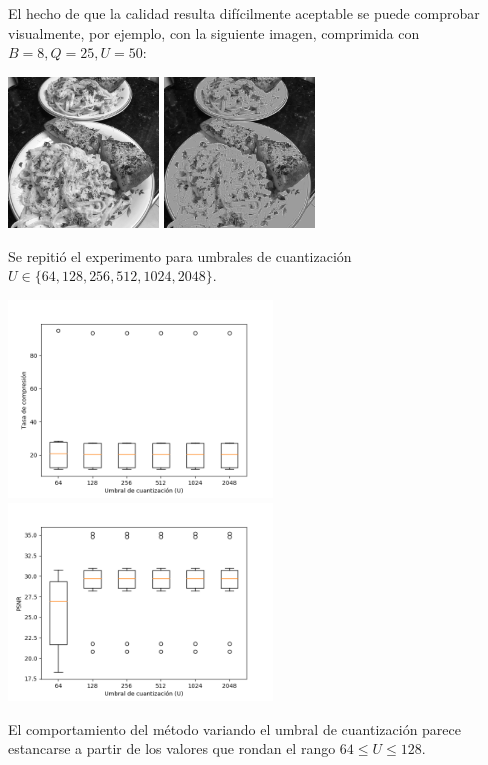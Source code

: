 \documentclass{article}
\newcommand{\set}[1]{\{#1\}}
\begin{document}
El hecho de que la calidad resulta difícilmente aceptable
se puede comprobar
visualmente, por ejemplo, con la siguiente imagen, comprimida
con $B = 8, Q = 25, U = 50$:
\begin{center}
\includegraphics[width=4cm]{../imgs/input/imgs_gray/img07.png}
\includegraphics[width=4cm]{../imgs/output/gray_8_25_50/img07.png}
\end{center}
Se repitió el experimento para
umbrales de cuantización $U \in \set{64, 128, 256, 512, 1024, 2048}$.
\begin{center}
  \includegraphics[width=7cm]{../imgs/output/gray_plots/ufinal2_rate.png}
  \includegraphics[width=7cm]{../imgs/output/gray_plots/ufinal2_psnr.png}
\end{center}
El comportamiento del método variando el umbral de cuantización
parece estancarse a partir de los valores que rondan el rango
$64 \leq U \leq 128$.
\end{document}
